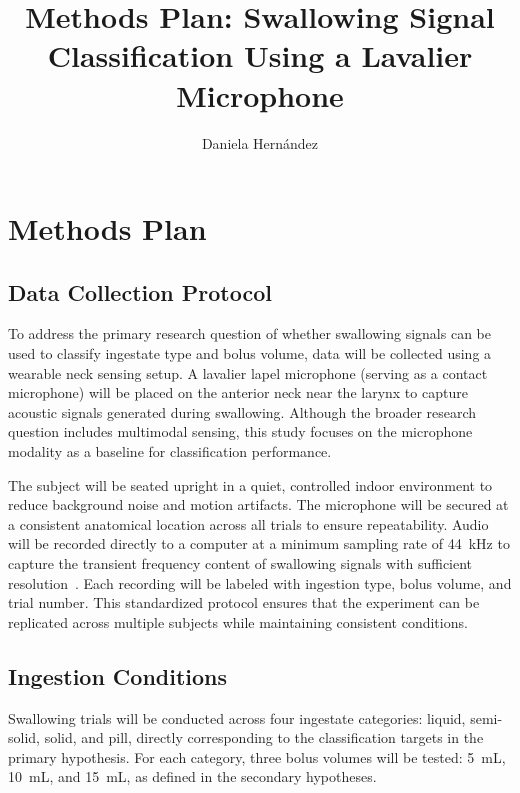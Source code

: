\documentclass[10pt,conference]{IEEEtran}
\begin{document}
\title{Methods Plan: Swallowing Signal Classification Using a Lavalier Microphone}

\author{
Daniela Hernández\\
}

\maketitle

\section{Methods Plan}

\subsection{Data Collection Protocol}
To address the primary research question of whether swallowing signals can be used to classify ingestate type and bolus volume, data will be collected using a wearable neck sensing setup. A lavalier lapel microphone (serving as a contact microphone) will be placed on the anterior neck near the larynx to capture acoustic signals generated during swallowing. Although the broader research question includes multimodal sensing, this study focuses on the microphone modality as a baseline for classification performance.

The subject will be seated upright in a quiet, controlled indoor environment to reduce background noise and motion artifacts. The microphone will be secured at a consistent anatomical location across all trials to ensure repeatability. Audio will be recorded directly to a computer at a minimum sampling rate of 44~kHz to capture the transient frequency content of swallowing signals with sufficient resolution~\cite{freq_chart,nyquist,adc}. Each recording will be labeled with ingestion type, bolus volume, and trial number. This standardized protocol ensures that the experiment can be replicated across multiple subjects while maintaining consistent conditions.

\subsection{Ingestion Conditions}
Swallowing trials will be conducted across four ingestate categories: liquid, semi-solid, solid, and pill, directly corresponding to the classification targets in the primary hypothesis. For each category, three bolus volumes will be tested: 5~mL, 10~mL, and 15~mL, as defined in the secondary hypotheses.
\end{document}
